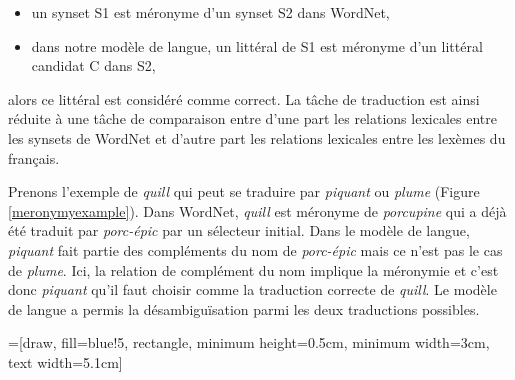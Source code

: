 \begin{itemize}

    \item un synset S1 est méronyme d'un synset S2 dans WordNet,

    \item dans notre modèle de langue, un littéral de S1 est méronyme d'un
        littéral candidat C dans S2,

\end{itemize}

alors ce littéral est considéré comme correct. La tâche de traduction est ainsi
réduite à une tâche de comparaison entre d'une part les relations lexicales
entre les synsets de WordNet et d'autre part les relations lexicales entre les
lexèmes du français.

Prenons l'exemple de \textit{quill} qui peut se traduire par \textit{piquant}
ou \textit{plume} (Figure \ref{meronymyexample}). Dans WordNet, \textit{quill}
est méronyme de \textit{porcupine} qui a déjà été traduit par
\textit{porc-épic} par un sélecteur initial. Dans le modèle de langue,
\textit{piquant} fait partie des compléments du nom de \textit{porc-épic} mais
ce n'est pas le cas de \textit{plume}. Ici, la relation de complément du nom
implique la méronymie et c'est donc \textit{piquant} qu'il faut choisir comme
la traduction correcte de \textit{quill}. Le modèle de langue a permis la
désambiguïsation parmi les deux traductions possibles.

=[draw, fill=blue!5, rectangle, minimum height=0.5cm, minimum
width=3cm, text width=5.1cm]

